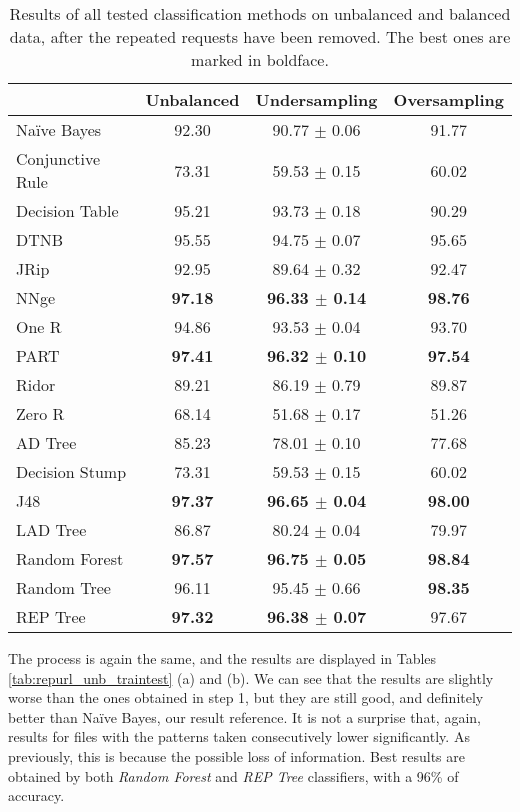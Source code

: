 \documentclass{llncs}
\begin{document}
\begin{table}[htpb]
\centering
{\small
\begin{tabular}{|l|c|c|c|}
\cline{2-4}
\multicolumn{1}{l|}{} & Unbalanced & Undersampling & Oversampling \\
\hline
Na\"ive Bayes & 92.30 & 90.77 $\pm$ 0.06 & 91.77 \\
\cline{1-1}
Conjunctive Rule & 73.31 & 59.53 $\pm$ 0.15 & 60.02 \\
\cline{1-1}
Decision Table & 95.21 & 93.73 $\pm$ 0.18 & 90.29 \\
\cline{1-1}
DTNB & 95.55 & 94.75 $\pm$ 0.07 & 95.65 \\
\cline{1-1}
JRip & 92.95 & 89.64 $\pm$ 0.32 & 92.47 \\
\cline{1-1}
NNge & \textbf{97.18} & \textbf{96.33 $\pm$ 0.14} & \textbf{98.76} \\
\cline{1-1}
One R & 94.86 & 93.53 $\pm$ 0.04 & 93.70 \\
\cline{1-1}
PART & \textbf{97.41} & \textbf{96.32 $\pm$ 0.10} & \textbf{97.54} \\
\cline{1-1}
Ridor & 89.21 & 86.19 $\pm$ 0.79 & 89.87 \\
\cline{1-1}
Zero R & 68.14 & 51.68 $\pm$ 0.17 & 51.26 \\
\cline{1-1}
AD Tree & 85.23 & 78.01 $\pm$ 0.10 & 77.68 \\
\cline{1-1}
Decision Stump & 73.31 & 59.53 $\pm$ 0.15 & 60.02 \\
\cline{1-1}
J48 & \textbf{97.37} & \textbf{96.65 $\pm$ 0.04} & \textbf{98.00} \\
\cline{1-1}
LAD Tree & 86.87 & 80.24 $\pm$ 0.04 & 79.97 \\
\cline{1-1}
Random Forest & \textbf{97.57} & \textbf{96.75 $\pm$ 0.05} & \textbf{98.84} \\
\cline{1-1}
Random Tree & 96.11 & 95.45 $\pm$ 0.66 & \textbf{98.35} \\
\cline{1-1}
REP Tree & \textbf{97.32} & \textbf{96.38 $\pm$ 0.07} & 97.67 \\
\hline
\end{tabular}
}
\caption[Global classification methods ranking after the removal of entries that could lead to missclassification.]{\label{tab:gobalrank_repurls} Results of all tested classification methods on unbalanced and balanced data, after the repeated requests have been removed. The best ones are marked in boldface.}
\end{table}

The process is again the same, and the results are displayed in Tables \ref{tab:repurl_unb_traintest} (a) and (b). We can see that the results are slightly worse than the ones obtained in step 1, but they are still good, and definitely better than Na\"ive Bayes, our result reference. It is not a surprise that, again, results for files with the patterns taken consecutively lower significantly. As previously, this is because the possible loss of information. Best results are obtained by both \textit{Random Forest} and \textit{REP Tree} classifiers, with a 96\% of accuracy.
\end{document}
